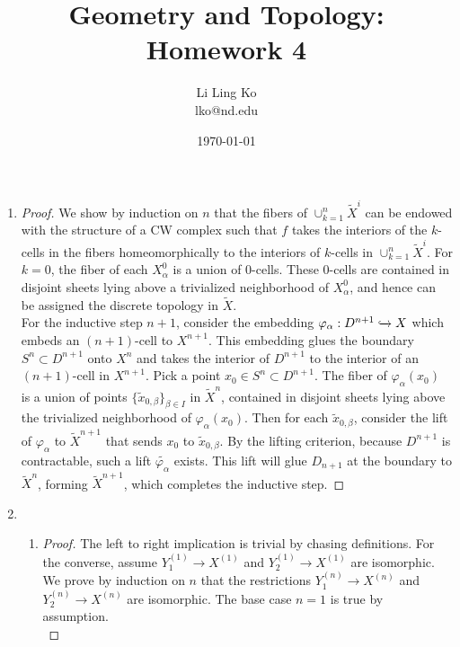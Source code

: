 \documentclass{article}
\begin{document}
\title{Geometry and Topology: Homework 4}
\author{Li Ling Ko\\ lko@nd.edu}
\date{\today}
\maketitle

\begin{enumerate}
  \item \begin{proof} We show by induction on $n$ that the fibers of
    $\cup_{k=1}^n\widetilde{X}^{i}$ can be endowed with the structure of a
    CW complex such that $f$ takes the interiors of the $k$-cells in the
    fibers homeomorphically to the interiors of $k$-cells in
    $\cup_{k=1}^n\widetilde{X}^{i}$. For $k=0$, the fiber of each
    $X^0_{\alpha}$ is a union of $0$-cells. These 0-cells are contained in
    disjoint sheets lying above a trivialized neighborhood of
    $X^0_{\alpha}$, and hence can be assigned the discrete topology in
    $\widetilde{X}$. \\

    For the inductive step $n+1$, consider the embedding
    $\varphi_\alpha:D^{n+1}\xhookrightarrow{}X$ which embeds an
    $(n+1)$-cell to $X^{n+1}$. This embedding glues the boundary
    $S^n\subset D^{n+1}$ onto $X^n$ and takes the interior of $D^{n+1}$ to
    the interior of an $(n+1)$-cell in $X^{n+1}$. Pick a point $x_0\in
    S^n\subset D^{n+1}$. The fiber of $\varphi_\alpha(x_0)$ is a union of
    points $\{\widetilde{x}_{0,\beta}\}_{\beta\in I}$ in $\widetilde{X}^n$,
    contained in disjoint sheets lying above the trivialized neighborhood
    of $\varphi_\alpha(x_0)$. Then for each $\widetilde{x}_{0,\beta}$,
    consider the lift of $\varphi_\alpha$ to $\widetilde{X}^{n+1}$ that
    sends $x_0$ to $\widetilde{x}_{0,\beta}$. By the lifting criterion,
    because $D^{n+1}$ is contractable, such a lift
    $\widetilde{\varphi_\alpha}$ exists. This lift will glue $D_{n+1}$ at
    the boundary to $\widetilde{X}^n$, forming $\widetilde{X}^{n+1}$, which
    completes the inductive step.
  \end{proof}

  \item
    \begin{enumerate}
      \item \begin{proof}
        The left to right implication is trivial by chasing definitions.
        For the converse, assume $Y_1^{(1)}\rightarrow X^{(1)}$ and
        $Y_2^{(1)}\rightarrow X^{(1)}$ are isomorphic. We prove by
        induction on $n$ that the restrictions $Y_1^{(n)}\rightarrow
        X^{(n)}$ and $Y_2^{(n)}\rightarrow X^{(n)}$ are isomorphic. The
        base case $n=1$ is true by assumption. \\


\end{proof}
\end{enumerate}
\end{enumerate}
\end{document}

